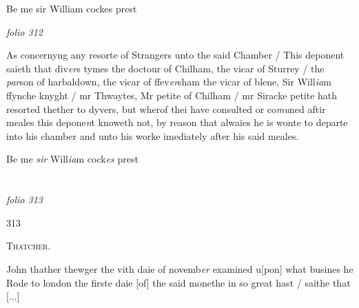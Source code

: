 \documentclass[12pt, a4paper]{book}
\begin{document}
		\ifthenelse{\isodd{\thepage}}
		{\reversemarginpar}
		{\normalmarginpar}
		Be me sir William cockes prest

\dotfill
						\newpage
{}

\textit{folio 312}



		\ifthenelse{\isodd{\thepage}}
		{\reversemarginpar}
		{\normalmarginpar}
		As concernyng any resorte of Strangers unto the said
Chamber / This deponent saieth that div\textit{er}s tymes
the doctour of Chilham, the vicar of Sturrey / the 
\textit{par}son of harbaldown, the vicar of ffev\textit{er}sham the 
vicar of blene, Sir Will\textit{ia}m ffynche knyght / mr 
Thwaytes, Mr petite of Chilham / mr Siracke petite 
hath resorted thether to dyvers, but wherof thei
have consulted or co\textit{mu}ned aftir meales this depone\textit{n}t 
knoweth not, by reason that alwaies he is wonte
to departe into his chamber and unto his worke
imediately after his said 
			meales.

 	
		\ifthenelse{\isodd{\thepage}}
		{\reversemarginpar}
		{\normalmarginpar}
		Be me \textit{sir} Will\textit{ia}m cock\textit{es} prest

\dotfill
						\newpage {} \section*{}  \subsection*{}

\textit{folio 313}



\begin{flushright}{\color{Mahogany}313}\end{flushright}

				\begin{center} \begin{large} {\scshape Thatcher.} \end{large} \end{center}
			

	
				\marginpar[\vspace{0.5cm}{\textcolor{Gray}{wintomen}}]{}
			
            		
		\ifthenelse{\isodd{\thepage}}
		{\reversemarginpar}
		{\normalmarginpar}
		John thather thewger the vith daie of novemb\textit{er} examined u[pon]
            		what busines he Rode to london the firste daie [of]
the said monethe in so great hast / saithe that 
				[...]
			
\end{document}
